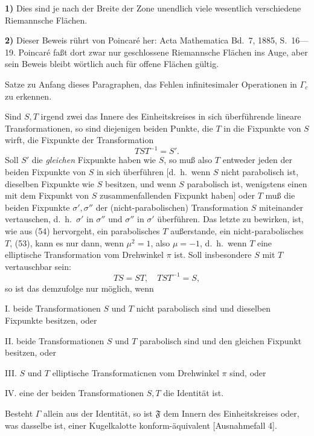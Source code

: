 \documentclass{article}
\begin{document}
\textbf{1)} Dies sind je nach der Breite der Zone unendlich viele wesentlich verschiedene Riemannsche Flächen.

\textbf{2)} Dieser Beweis rührt von Poincaré her: Acta Mathematica Bd.~7, 1885, S.~16---19. Poincaré faßt dort zwar nur geschlossene Riemannsche Flächen ins Auge, aber sein Beweis bleibt wörtlich auch für offene Flächen gültig.

Satze zu Anfang dieses Paragraphen, das Fehlen infinitesimaler Operationen in $\varGamma_c$ zu erkennen.

Sind $S, T$ irgend zwei das Innere des Einheitskreises in sich überführende lineare Transformationen, so sind diejenigen beiden Punkte, die $T$ in die Fixpunkte von $S$ wirft, die Fixpunkte der Transformation
\[ TST^{-1} = S'. \]
Soll $S'$ die \emph{gleichen} Fixpunkte haben wie $S$, so muß also $T$ entweder jeden der beiden Fixpunkte von $S$ in sich überführen [d.~h.\ wenn $S$ nicht parabolisch ist, dieselben Fixpunkte wie $S$ besitzen, und wenn $S$ parabolisch ist, wenigstens einen mit dem Fixpunkt von $S$ zusammenfallenden Fixpunkt haben] oder $T$ muß die beiden Fixpunkte $\sigma', \sigma''$ der (nicht-parabolischen) Transformation $S$ miteinander vertauschen, d.~h.\ $\sigma'$ in $\sigma''$ und $\sigma''$ in $\sigma'$ überführen. Das letzte zu bewirken, ist, wie aus (54) hervorgeht, ein parabolisches $T$ außerstande, ein nicht-parabolisches $T$, (53), kann es nur dann, wenn $\mu^2 = 1$, also $\mu = -1$, d.~h.\ wenn $T$ eine elliptische Transformation vom Drehwinkel $\pi$ ist. Soll insbesondere $S$ mit $T$ vertauschbar sein:
\[ TS = ST, \quad TST^{-1} = S, \]
so ist das demzufolge nur möglich, wenn

I. beide Transformationen $S$ und $T$ nicht parabolisch sind und dieselben Fixpunkte besitzen, oder

II. beide Transformationen $S$ und $T$ parabolisch sind und den gleichen Fixpunkt besitzen, oder

III. $S$ und $T$ elliptische Transformaticnen vom Drehwinkel $\pi$ sind, oder

IV. eine der beiden Transformationen $S, T$ die Identität ist.

Besteht $\varGamma$ allein aus der Identität, so ist $\mathfrak{F}$ dem Innern des Einheitskreises oder, was dasselbe ist, einer Kugelkalotte konform-äquivalent [Ausnahmefall 4].
\end{document}

